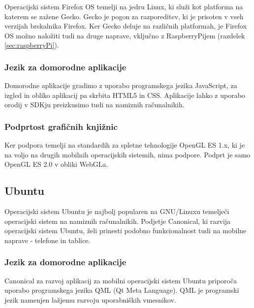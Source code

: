 Operacijski sistem Firefox OS temelji na jedru Linux, ki služi kot platforma na katerem se zažene Gecko. Gecko je pogon za razporeditev, ki je prisoten v vseh verzijah brskalnika Firefox. Ker Gecko deluje na različnih platformah, je Firefox OS možno naložiti tudi na druge naprave, vključno z RaspberryPijem (razdelek \ref{sec:raspberryPi}). 

\subsubsection{Jezik za domorodne aplikacije}

Domorodne aplikacije gradimo z uporabo programskega jezika JavaScript, za izgled in obliko aplikacij pa skrbita HTML5 in CSS. Aplikacije lahko z uporabo orodij v SDKju preizkusimo tudi na namiznih računalnikih.

\subsubsection{Podprtost grafičnih knjižnic}

Ker podpora temelji na standardih za spletne tehnologije OpenGL ES 1.x, ki je na voljo na drugih mobilnih operacijskih sistemih, nima podpore. Podprt je samo OpenGL ES 2.0 v obliki WebGLa.

\subsection{Ubuntu}

Operacijski sistem Ubuntu \cite{ubuntu} je najbolj popularen na GNU/Linuxu temelječi operacijski sistem na namiznih računalnikih. Podjetje Canonical, ki razvija operacijski sistem Ubuntu, želi prinesti podobno funkcionalnost tudi na mobilne naprave - telefone in tablice. %


\subsubsection{Jezik za domorodne aplikacije}

Canonical za razvoj aplikacij za mobilni operacijski sistem Ubuntu priporoča uporabo programskega jezika QML (Qt Meta Language). QML je programski jezik namenjen lažjemu razvoju uporabniških vmesnikov. 

